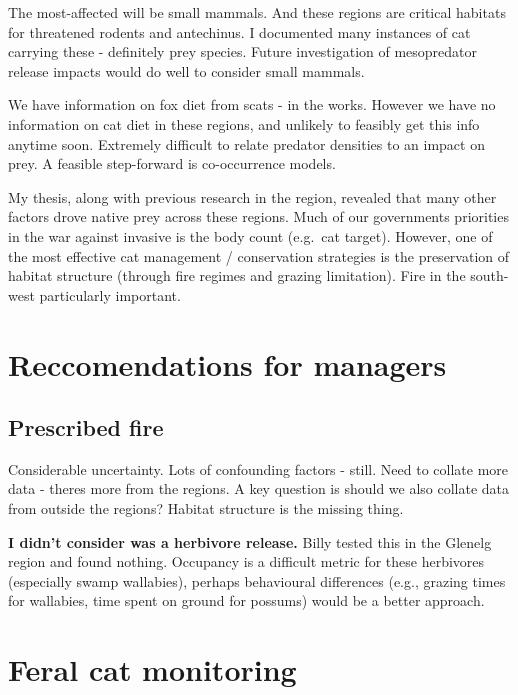 \documentclass[11pt,a4paper,titlepage,twoside,openright]{style/unimelbthesis}
\begin{document}
\begin{mainmatter}
The most-affected will be small mammals. And these regions are critical habitats for threatened rodents and antechinus. I documented many instances of cat carrying these - definitely prey species. Future investigation of mesopredator release impacts would do well to consider small mammals.

We have information on fox diet from scats - in the works. However we have no information on cat diet in these regions, and unlikely to feasibly get this info anytime soon. Extremely difficult to relate predator densities to an impact on prey. A feasible step-forward is co-occurrence models.

My thesis, along with previous research in the region, revealed that many other factors drove native prey across these regions. Much of our governments priorities in the war against invasive is the body count (e.g.~cat target). However, one of the most effective cat management / conservation strategies is the preservation of habitat structure (through fire regimes and grazing limitation). Fire in the south-west particularly important.

\hypertarget{reccomendations-for-managers}{%
\section{Reccomendations for managers}\label{reccomendations-for-managers}}

\hypertarget{prescribed-fire}{%
\subsection{Prescribed fire}\label{prescribed-fire}}

Considerable uncertainty. Lots of confounding factors - still.
Need to collate more data - theres more from the regions.
A key question is should we also collate data from outside the regions?
Habitat structure is the missing thing.

\textbf{I didn't consider was a herbivore release.}
Billy tested this in the Glenelg region and found nothing. Occupancy is a difficult metric for these herbivores (especially swamp wallabies), perhaps behavioural differences (e.g., grazing times for wallabies, time spent on ground for possums) would be a better approach.

\hypertarget{feral-cat-monitoring}{%
\section{Feral cat monitoring}\label{feral-cat-monitoring}}


\end{mainmatter}
\end{document}
